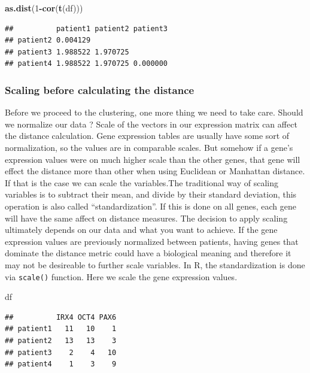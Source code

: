 \documentclass[12pt,]{krantz}
\newenvironment{Shaded}{\begin{snugshade}}{\end{snugshade}}
\newcommand{\DecValTok}[1]{\textcolor[rgb]{0.00,0.00,0.81}{#1}}
\newcommand{\KeywordTok}[1]{\textcolor[rgb]{0.13,0.29,0.53}{\textbf{#1}}}
\newcommand{\NormalTok}[1]{#1}
\newcommand{\OperatorTok}[1]{\textcolor[rgb]{0.81,0.36,0.00}{\textbf{#1}}}
\theoremstyle{definition}
\theoremstyle{definition}
\theoremstyle{definition}
\theoremstyle{remark}
\begin{document}
\begin{Shaded}
\begin{Highlighting}[]
\KeywordTok{as.dist}\NormalTok{(}\DecValTok{1}\OperatorTok{-}\KeywordTok{cor}\NormalTok{(}\KeywordTok{t}\NormalTok{(df)))}
\end{Highlighting}
\end{Shaded}

\begin{verbatim}
##          patient1 patient2 patient3
## patient2 0.004129                  
## patient3 1.988522 1.970725         
## patient4 1.988522 1.970725 0.000000
\end{verbatim}

\hypertarget{scaling-before-calculating-the-distance}{%
\subsubsection{Scaling before calculating the
distance}\label{scaling-before-calculating-the-distance}}

Before we proceed to the clustering, one more thing we need to take
care. Should we normalize our data ? Scale of the vectors in our
expression matrix can affect the distance calculation. Gene expression
tables are usually have some sort of normalization, so the values are in
comparable scales. But somehow if a gene's expression values were on
much higher scale than the other genes, that gene will effect the
distance more than other when using Euclidean or Manhattan distance. If
that is the case we can scale the variables.The traditional way of
scaling variables is to subtract their mean, and divide by their
standard deviation, this operation is also called ``standardization''.
If this is done on all genes, each gene will have the same affect on
distance measures. The decision to apply scaling ultimately depends on
our data and what you want to achieve. If the gene expression values are
previously normalized between patients, having genes that dominate the
distance metric could have a biological meaning and therefore it may not
be desireable to further scale variables. In R, the standardization is
done via \texttt{scale()} function. Here we scale the gene expression
values.

\begin{Shaded}
\begin{Highlighting}[]
\NormalTok{df}
\end{Highlighting}
\end{Shaded}

\begin{verbatim}
##          IRX4 OCT4 PAX6
## patient1   11   10    1
## patient2   13   13    3
## patient3    2    4   10
## patient4    1    3    9
\end{verbatim}
\end{document}
